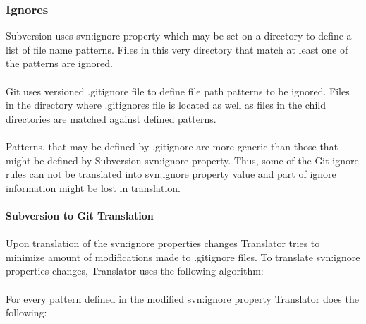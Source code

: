 \subsubsection{Ignores}
Subversion uses svn:ignore property which may be set on a directory to define a list of
file name patterns. Files in this very directory that match at least one of the patterns are ignored.
\\\\
Git uses versioned .gitignore file to define file path patterns to be ignored. Files in the directory
where .gitignores file is located as well as files in the child directories are matched against defined patterns.
\\\\
Patterns, that may be defined by .gitignore are more generic than those that might be defined by Subversion svn:ignore property.
Thus, some of the Git ignore rules can not be translated into svn:ignore property value and part of ignore information might be lost 
in translation.
\\\\
\textbf{Subversion to Git Translation}
\\\\
Upon translation of the svn:ignore properties changes Translator tries to minimize amount of modifications
made to .gitignore files. To translate svn:ignore properties changes, Translator uses the following algorithm:
\\\\
For every pattern defined in the modified svn:ignore property Translator does the following:
